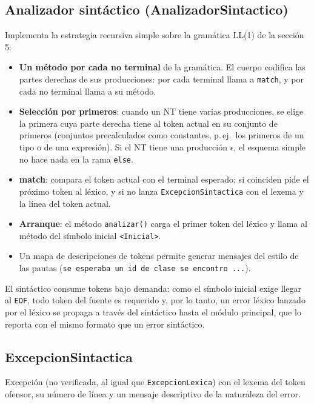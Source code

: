 \documentclass[11pt,a4paper]{article}
\begin{document}
\subsection{Analizador sintáctico (AnalizadorSintactico)}

Implementa la estrategia recursiva simple sobre la gramática LL(1) de la sección
5:

\begin{itemize}
  \item \textbf{Un método por cada no terminal} de la gramática. El cuerpo codifica las
        partes derechas de sus producciones: por cada terminal llama a \texttt{match}, y
        por cada no terminal llama a su método.
  \item \textbf{Selección por primeros}: cuando un NT tiene varias producciones, se elige
        la primera cuya parte derecha tiene al token actual en su conjunto de primeros
        (conjuntos precalculados como constantes, p.\,ej.\ los primeros de un tipo o de una
        expresión). Si el NT tiene una producción $\epsilon$, el esquema simple no hace
        nada en la rama \texttt{else}.
  \item \textbf{match}: compara el token actual con el terminal esperado; si coinciden pide
        el próximo token al léxico, y si no lanza \texttt{ExcepcionSintactica} con el
        lexema y la línea del token actual.
  \item \textbf{Arranque}: el método \texttt{analizar()} carga el primer token del léxico y
        llama al método del símbolo inicial \texttt{<Inicial>}.
  \item Un mapa de descripciones de tokens permite generar mensajes del estilo de las
        pautas (\texttt{se esperaba un id de clase se encontro ...}).
\end{itemize}

El sintáctico consume tokens bajo demanda: como el símbolo inicial exige llegar al
\texttt{EOF}, todo token del fuente es requerido y, por lo tanto, un error léxico lanzado
por el léxico se propaga a través del sintáctico hasta el módulo principal, que lo reporta
con el mismo formato que un error sintáctico.

\subsection{ExcepcionSintactica}

Excepción (no verificada, al igual que \texttt{ExcepcionLexica}) con el lexema del token
ofensor, su número de línea y un mensaje descriptivo de la naturaleza del error.
\end{document}
